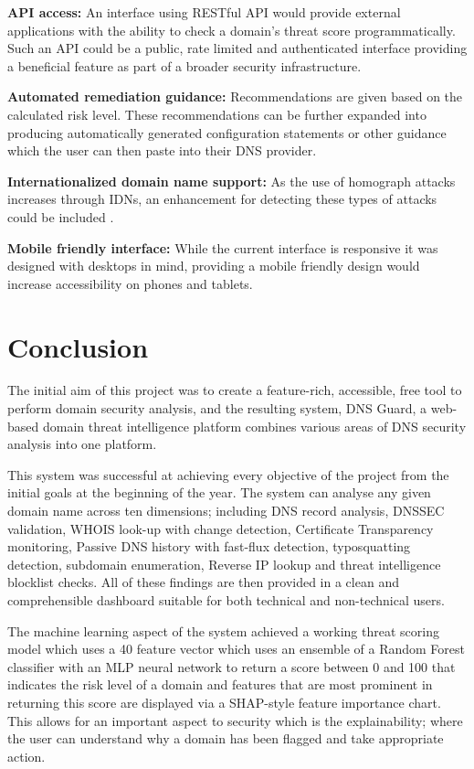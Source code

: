 \documentclass[12pt, a4paper, oneside]{report}
\begin{document}
\textbf{API access:} An interface using RESTful API would provide external applications with the ability to check a domain's threat score programmatically. Such an API could be a public, rate limited and authenticated interface providing a beneficial feature as part of a broader security infrastructure.

\textbf{Automated remediation guidance:} Recommendations are given based on the calculated risk level. These recommendations can be further expanded into producing automatically generated configuration statements or other guidance which the user can then paste into their DNS provider.

\textbf{Internationalized domain name support:} As the use of homograph attacks increases through IDNs, an enhancement for detecting these types of attacks could be included \cite{holz2008fastflux}.

\textbf{Mobile friendly interface:} While the current interface is responsive it was designed with desktops in mind, providing a mobile friendly design would increase accessibility on phones and tablets.

\chapter*{Conclusion}
\setcounter{chapter}{6}
\setcounter{section}{0}

The initial aim of this project was to create a feature-rich, accessible, free tool to perform domain security analysis, and the resulting system, DNS Guard, a web-based domain threat intelligence platform combines various areas of DNS security analysis into one platform.

This system was successful at achieving every objective of the project from the initial goals at the beginning of the year. The system can analyse any given domain name across ten dimensions; including DNS record analysis, DNSSEC validation, WHOIS look-up with change detection, Certificate Transparency monitoring, Passive DNS history with fast-flux detection, typosquatting detection, subdomain enumeration, Reverse IP lookup and threat intelligence blocklist checks. All of these findings are then provided in a clean and comprehensible dashboard suitable for both technical and non-technical users.

The machine learning aspect of the system achieved a working threat scoring model which uses a 40 feature vector which uses an ensemble of a Random Forest classifier with an MLP neural network to return a score between 0 and 100 that indicates the risk level of a domain and features that are most prominent in returning this score are displayed via a SHAP-style feature importance chart. This allows for an important aspect to security which is the explainability; where the user can understand why a domain has been flagged and take appropriate action.
\end{document}
